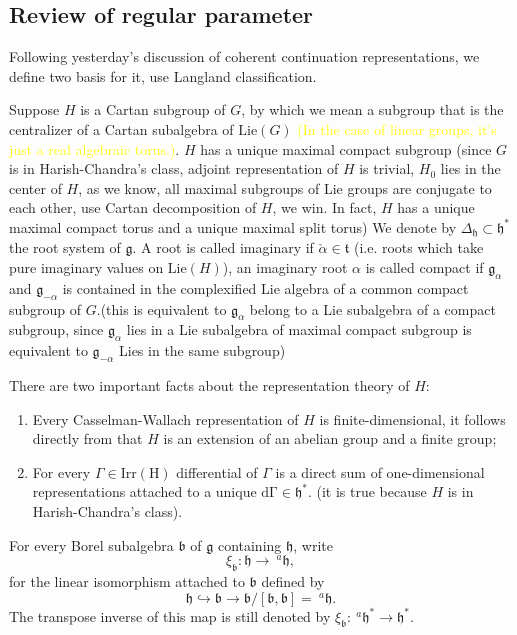 \documentclass[12pt]{amsart}
\numberwithin{equation}{section}
\newcommand{\fb}{\mathfrak{b}}
\newcommand{\fg}{\mathfrak{g}}
\newcommand{\fh}{\mathfrak{h}}
\newcommand{\ft}{\mathfrak{t}}
\newcommand{\Lie}{{\mathrm{Lie}}}
\begin{document}
\subsection{Review of regular parameter}

Following yesterday's discussion of coherent continuation representations, we define two basis
for it, use Langland classification.

Suppose $H$ is a Cartan subgroup of $G$, by which we mean a subgroup that is the centralizer of
a Cartan subalgebra of $\Lie(G)$ \textcolor{yellow}{(In the case of linear groups, it's just a
  real algebraic torus.)}. $H$ has a unique maximal compact subgroup (since $G$ is in Harish-Chandra's
class, adjoint representation of $H$ is trivial, $H_0$ lies in the center of $H$, as we know, all
maximal subgroups of Lie groups are conjugate to each other, use Cartan decomposition of $H$, we win. In fact,
$H$ has a unique maximal compact torus and a unique maximal split torus)
We denote by $\Delta_{\fh} \subset \fh^*$ the root system of $\fg$. A root is called imaginary
if $\check{\alpha } \in \ft$ (i.e. roots which take pure imaginary values on $\Lie(H)$), an imaginary root $\alpha$ is
called compact if $\fg_{\alpha}$ and $\fg_{-\alpha}$ is contained in the complexified Lie algebra of a common compact subgroup of $G$.(this is equivalent to $\fg_\alpha $ belong to a Lie subalgebra of a compact subgroup, since $\fg_\alpha $ lies in a Lie subalgebra of maximal compact subgroup is equivalent to $\fg_{-\alpha }$ Lies in the same subgroup)


There are two important facts about the representation theory of $H$:
\begin{enumerate}
  \item Every Casselman-Wallach representation of $H$ is finite-dimensional, it follows directly from that $H$ is an extension of an abelian group and a finite group;
  \item For every $\Gamma \in \mathrm{Irr(H)}$ differential of $\Gamma$ is a direct sum of one-dimensional representations attached to a unique $\mathrm{d\Gamma \in \fh^*}$.
        (it is true because $H$ is in Harish-Chandra's class).
\end{enumerate}


For every Borel subalgebra $\fb$ of $\fg$ containing $\fh$, write 
$$\xi_{\fb}: \fh \to \ ^{a}\fh,$$
for the linear isomorphism attached to $\fb$ defined by 
$$\fh \hookrightarrow  \fb \to \fb / [\fb,\fb] = \ {^{a}\fh}.$$
The transpose inverse of this map is still denoted by $\xi_{\fb}: \ ^{a}\fh^* \to \fh^*$.\\
\end{document}
